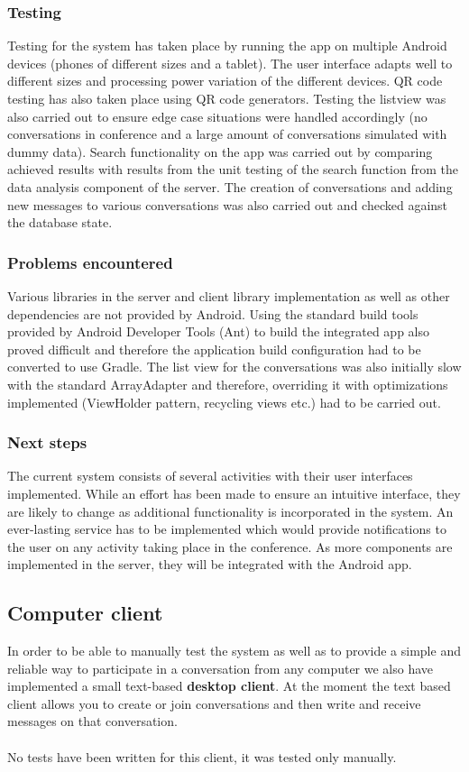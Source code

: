\documentclass[12p, a4paper, onecolumn]{report}
\begin{document}
\subsubsection{Testing}

Testing for the system has taken place by running the app on multiple Android devices (phones of different sizes and a tablet). The user interface adapts well to different sizes and processing power variation of the different devices. QR code testing has also taken place using QR code generators. Testing the listview was also carried out to ensure edge case situations were handled accordingly (no conversations in conference and a large amount of conversations simulated with dummy data). Search functionality on the app was carried out by comparing achieved results with results from the unit testing of the search function from the data analysis component of the server. The creation of conversations and adding new messages to various conversations was also carried out and checked against the database state.

\subsubsection{Problems encountered}

Various libraries in the server and client library implementation as well as other dependencies are not provided by Android. Using the standard build tools provided by Android Developer Tools (Ant) to build the integrated app also proved difficult and therefore the application build configuration had to be converted to use Gradle. The list view for the conversations was also initially slow with the standard ArrayAdapter and therefore, overriding it with optimizations implemented (ViewHolder pattern, recycling views etc.) had to be carried out.

\subsubsection{Next steps}

The current system consists of several activities with their user interfaces implemented. While an effort has been made to ensure an intuitive interface, they are likely to change as additional functionality is incorporated in the system. An ever-lasting service has to be implemented which would provide notifications to the user on any activity taking place in the conference. As more components are implemented in the server, they will be integrated with the Android app.

\subsection{Computer client}

In order to be able to manually test the system as well as to provide a simple and reliable way to participate in a conversation from any computer we also have implemented a small text-based \textbf{desktop client}.  At the moment the text based client allows you to create or join conversations and then write and receive messages on that conversation. \\ \\
No tests have been written for this client, it was tested only manually.
\end{document}
